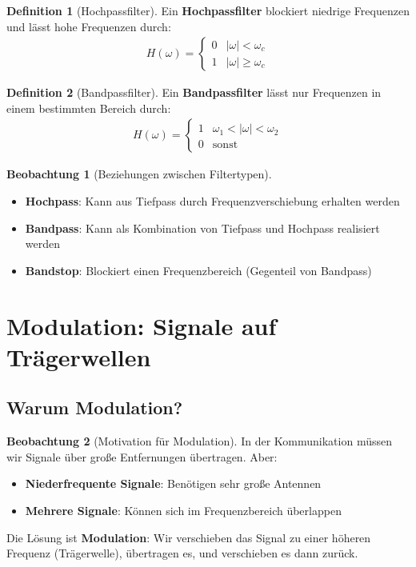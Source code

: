 ﻿\documentclass[a4paper,12pt]{report}
\theoremstyle{definition}
\newtheorem{definition}{Definition}
\newtheorem{beobachtung}{Beobachtung}
\begin{document}
	\begin{definition}[Hochpassfilter]
		Ein \textbf{Hochpassfilter} blockiert niedrige Frequenzen und lässt hohe Frequenzen durch:
		\begin{align}
			H(\omega) = \begin{cases} 0 & |\omega| < \omega_c \\ 1 & |\omega| \geq \omega_c \end{cases}
		\end{align}
	\end{definition}
	
	\begin{definition}[Bandpassfilter]
		Ein \textbf{Bandpassfilter} lässt nur Frequenzen in einem bestimmten Bereich durch:
		\begin{align}
			H(\omega) = \begin{cases} 1 & \omega_1 < |\omega| < \omega_2 \\ 0 & \text{sonst} \end{cases}
		\end{align}
	\end{definition}
	
	\begin{beobachtung}[Beziehungen zwischen Filtertypen]
		\begin{itemize}
			\item[-] \textbf{Hochpass}: Kann aus Tiefpass durch Frequenzverschiebung erhalten werden
			\item[-] \textbf{Bandpass}: Kann als Kombination von Tiefpass und Hochpass realisiert werden
			\item[-] \textbf{Bandstop}: Blockiert einen Frequenzbereich (Gegenteil von Bandpass)
		\end{itemize}
	\end{beobachtung}
	
	\section{Modulation: Signale auf Trägerwellen}
	
	\subsection{Warum Modulation?}
	
	\begin{beobachtung}[Motivation für Modulation]
		In der Kommunikation müssen wir Signale über große Entfernungen übertragen. Aber:
		\begin{itemize}
			\item[-] \textbf{Niederfrequente Signale}: Benötigen sehr große Antennen
			\item[-] \textbf{Mehrere Signale}: Können sich im Frequenzbereich überlappen
		\end{itemize}
		
		Die Lösung ist \textbf{Modulation}: Wir verschieben das Signal zu einer höheren Frequenz (Trägerwelle), übertragen es, und verschieben es dann zurück.
	\end{beobachtung}
	
\end{document}

